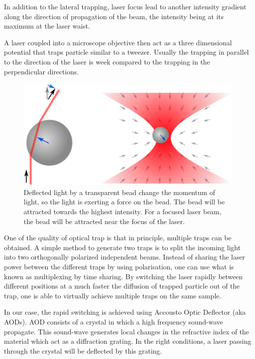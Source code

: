 \documentclass[A4paperpaper,11pt,english]{sphinxmanual}
\begin{document}
In addition to the lateral trapping, laser focus lead to
another intensity gradient along the direction of propagation of the
beam, the intensity being at its maximum at the laser waist.

A laser coupled into a microscope objective then act as a three dimensional
potential that traps particle similar to a tweezer. Usually the trapping in
parallel to the direction of the laser is week compared to the trapping in the
perpendicular directions.
\begin{figure}[htbp]
\centering
\capstart

\includegraphics[width=0.700\linewidth]{ot1.png}
\caption{Deflected light by a transparent bead change the momentum of light, so the
light is exerting a force on the bead. The bead will be attracted towards
the highest intensity.  For a focused laser beam, the bead will be attracted
near the focus of the laser.}\label{parts/part1:setup}\end{figure}

One of the quality of optical trap is that in principle, multiple traps can be
obtained. A simple method to generate two traps is to split the incoming light
into two orthogonally polarized independent beams.  Instead of sharing the
laser power between the different traps by using polarisation, one can use what
is known as multiplexing by time sharing. By switching the laser rapidly
between different positions at a much faster the diffusion of trapped particle
out of the trap,  one is able to virtually achieve multiple traps on the same
sample.

In our case, the rapid switching is achieved using Accousto Optic Deflector
(aka AODs).  AOD consists of a crystal in which a high frequency
sound-wave propagate. This sound-wave generates local changes in the
refractive index of the material which act as a diffraction grating. In
the right conditions, a laser passing through the crystal will
be deflected by this grating.
\end{document}
